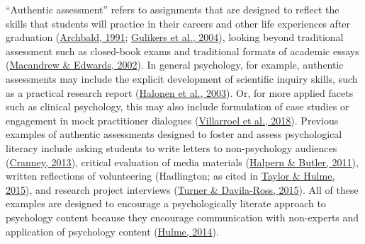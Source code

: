 \documentclass[
  11pt,
  letterpaper,
  oneside,
  open=any]{scrbook}
\begin{document}
``Authentic assessment'' refers to assignments that are designed to
reflect the skills that students will practice in their careers and
other life experiences after graduation
(\href{https://journals-sagepub-com.gold.idm.oclc.org/doi/full/10.1177/00986283211027278\#bibr4-00986283211027278}{Archbald,
1991};
\href{https://journals-sagepub-com.gold.idm.oclc.org/doi/full/10.1177/00986283211027278\#bibr24-00986283211027278}{Gulikers
et al., 2004}), looking beyond traditional assessment such as
closed-book exams and traditional formats of academic essays
(\href{https://journals-sagepub-com.gold.idm.oclc.org/doi/full/10.1177/00986283211027278\#bibr44-00986283211027278}{Macandrew
\& Edwards, 2002}). In general psychology, for example, authentic
assessments may include the explicit development of scientific inquiry
skills, such as a practical research report
(\href{https://journals-sagepub-com.gold.idm.oclc.org/doi/full/10.1177/00986283211027278\#bibr25-00986283211027278}{Halonen
et al., 2003}). Or, for more applied facets such as clinical psychology,
this may also include formulation of case studies or engagement in mock
practitioner dialogues
(\href{https://journals-sagepub-com.gold.idm.oclc.org/doi/full/10.1177/00986283211027278\#bibr66-00986283211027278}{Villarroel
et al., 2018}). Previous examples of authentic assessments designed to
foster and assess psychological literacy include asking students to
write letters to non-psychology audiences
(\href{https://journals-sagepub-com.gold.idm.oclc.org/doi/full/10.1177/00986283211027278\#bibr14-00986283211027278}{Cranney,
2013}), critical evaluation of media materials
(\href{https://journals-sagepub-com.gold.idm.oclc.org/doi/full/10.1177/00986283211027278\#bibr26-00986283211027278}{Halpern
\& Butler, 2011}), written reflections of volunteering (Hadlington; as
cited in
\href{https://journals-sagepub-com.gold.idm.oclc.org/doi/full/10.1177/00986283211027278\#bibr63-00986283211027278}{Taylor
\& Hulme, 2015}), and research project interviews
(\href{https://journals-sagepub-com.gold.idm.oclc.org/doi/full/10.1177/00986283211027278\#bibr65-00986283211027278}{Turner
\& Davila-Ross, 2015}). All of these examples are designed to encourage
a psychologically literate approach to psychology content because they
encourage communication with non-experts and application of psychology
content
(\href{https://journals-sagepub-com.gold.idm.oclc.org/doi/full/10.1177/00986283211027278\#bibr33-00986283211027278}{Hulme,
2014}).
\end{document}
